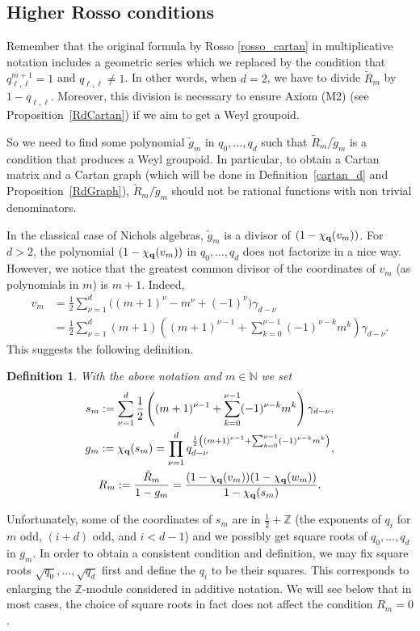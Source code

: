 \documentclass[pdftex]{sigma}
\numberwithin{equation}{section}
\newtheorem{Definition}[Theorem]{Definition}
\newcommand{\NN }{\mathbb{N}}
\newcommand{\ZZ }{\mathbb{Z}}
\newcommand{\qq }{{\bf q}}
\newcommand{\dn }{d}
\newcommand{\qR }{\tilde R}
\newcommand{\bich }{\chi}
\begin{document}
\subsection{Higher Rosso conditions}
Remember that the original formula by Rosso \eqref{rosso_cartan} in multiplicative notation includes a geometric series which we replaced by the condition that $q_{\ell,\ell}^{m+1}=1$ and $q_{\ell,\ell}\ne 1$. In other words, when $d=2$, we have to divide $\qR_m$ by $1-q_{\ell,\ell}$. Moreover, this division is necessary to ensure Axiom (M2) (see Proposition~\ref{RdCartan}) if we aim to get a Weyl groupoid.

So we need to find some polynomial $\tilde g_m$ in $q_0,\dots,q_d$ such that $\qR_m/\tilde g_m$ is a condition that produces a Weyl groupoid. In particular, to obtain a Cartan matrix and a Cartan graph (which will be done in Definition~\ref{cartan_d} and Proposition~\ref{RdGraph}),
$\qR_m/\tilde g_m$ should not be rational functions with non trivial denominators.

In the classical case of Nichols algebras, $\tilde g_m$ is a divisor of $(1-\chi_\qq(v_m))$. For $d>2$, the polynomial $(1-\chi_\qq(v_m))$ in $q_0,\dots,q_d$ does not factorize in a nice way. However, we notice that the greatest common divisor of the coordinates of $v_m$ (as polynomials in $m$) is $m+1$. Indeed,
\begin{align*}
v_m &= \frac{1}{2}\sum_{\nu=1}^d\big((m+1)^\nu-m^\nu+(-1)^\nu\big)\gamma_{d-\nu} \\
&=\frac{1}{2}\sum_{\nu=1}^d (m+1) \left( (m+1)^{\nu-1}+\sum_{k=0}^{\nu-1} (-1)^{\nu-k} m^k \right)\gamma_{d-\nu}.
\end{align*}
This suggests the following definition.

\begin{Definition}
With the above notation and $m\in\NN$ we set
\begin{gather}
s_m :=  \sum_{\nu=1}^d \frac{1}{2}\left( (m+1)^{\nu-1}+\sum_{k=0}^{\nu-1} (-1)^{\nu-k} m^k \right) \gamma_{\dn-\nu}, \nonumber\\
g_m :=  \chi_\qq(s_m) = \prod_{\nu=1}^d q_{\dn-\nu}^{\frac{1}{2}\left( (m+1)^{\nu-1}+\sum_{k=0}^{\nu-1} (-1)^{\nu-k} m^k \right)}, \nonumber\\
\label{Rossod} R_m :=  \frac{\qR_m}{1-g_m}
= \frac{(1-\bich_\qq(v_m))(1-\bich_\qq(w_m))}{1-\bich_\qq(s_m)}.
\end{gather}
\end{Definition}

Unfortunately, some of the coordinates of $s_m$ are in $\frac{1}{2}+\ZZ$ (the exponents of $q_i$ for $m$ odd, $(i+d)$ odd, and $i<\dn-1$) and we possibly get square roots of $q_0,\dots,q_\dn$ in $g_m$. In order to obtain a consistent condition and definition, we may fix square roots $\sqrt{q_0},\dots,\sqrt{q_\dn}$ first and define the $q_i$ to be their squares. This corresponds to enlarging the $\ZZ$-module considered in additive notation. We will see below that in most cases, the choice of square roots in fact does not affect the condition $R_m=0$.
\end{document}
